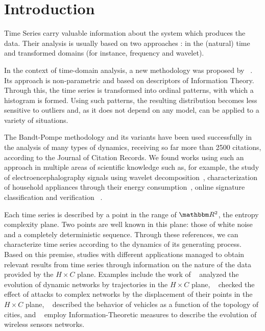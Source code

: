 \section{Introduction}\label{Sec:Intro}

Time Series carry valuable information about the system which produces the data.
Their analysis is usually based on two approaches \cite{TimeSeriesAnalysisCryerChan}: in the (natural) time and transformed domains (for instance, frequency and wavelet).

In the context of time-domain analysis, a new methodology was proposed by \citeauthor{Bandt2002Permutation}~\citeyear{Bandt2002Permutation}.
Its approach is non-parametric and based on descriptors of Information Theory.
Through this, the time series is transformed into ordinal patterns, with which a histogram is formed.
Using such patterns, the resulting distribution becomes less sensitive to outliers and, as it does not depend on any model, can be applied to a variety of situations.

The Bandt-Pompe methodology and its variants have been used successfully in the analysis of many types of dynamics, receiving so far more than \num{2500} citations, according to the Journal of Citation Records.
We found works using such an approach in multiple areas of scientific knowledge such as, for example,
the study of electroencephalography signals using wavelet decomposition~\cite{EEGAnalysisWaveletInformationTools},
characterization of household appliances through their energy consumption~\cite{CharacterizationElectricLoadInformationTheoryQuantifiers},
 online signature classification and verification~\cite{ClassificationVerificationOnlineHandwrittenSignatures}
 .

Each time series is described by a point in the range of $\mathbbm R^2$, the entropy complexity plane.
Two points are well known in this plane: those of white noise and a completely deterministic sequence.
Through these references, we can characterize time series according to the dynamics of its generating process.
Based on this premise, studies with different applications managed to obtain relevant results from time series through information on the nature of the data provided by the  $H \times C$ plane.
Examples include the work of \citeauthor{ComplexNetworksEvolution}~\citeyear{ComplexNetworksEvolution} analyzed the evolution of dynamic networks by trajectories in the $H \times C$ plane,
\citeauthor{InformationTheoryPerspectiveNetworkRobustness}~\citeyear{InformationTheoryPerspectiveNetworkRobustness} checked the effect of attacks to complex networks by the displacement of their points in the $H \times C$ plane,
\citeauthor{CharacterizationVehicleBehaviorInformationTheory}~\citeyear{CharacterizationVehicleBehaviorInformationTheory} described the behavior of vehicles as a function of the topology of cities, and
\citeauthor{StructuralChangesDataCommunicationWSN}~\citeyear{StructuralChangesDataCommunicationWSN} employ Information-Theoretic measures to describe the evolution of wireless sensors networks.

